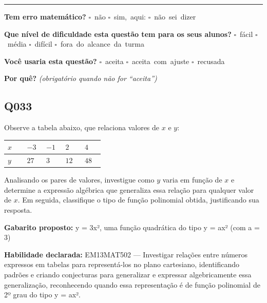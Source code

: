 \documentclass[11pt,a4paper]{article}
\begin{document}
\noindent\rule{\linewidth}{0.4pt}
\textbf{Tem erro matemático?}\quad
\mbox{$\square$~não} \quad \mbox{$\square$~sim, aqui:} \underline{\hspace{5cm}}
\quad \mbox{$\square$~não sei dizer}

\textbf{Que nível de dificuldade esta questão tem para os seus alunos?}\quad
\mbox{$\square$~fácil} \quad \mbox{$\square$~média} \quad
\mbox{$\square$~difícil} \quad \mbox{$\square$~fora do alcance da turma}

\textbf{Você usaria esta questão?}\quad
\mbox{$\square$~aceita} \quad \mbox{$\square$~aceita com ajuste} \quad
\mbox{$\square$~recusada}

\textbf{Por quê?} \emph{(obrigatório quando não for ``aceita'')}

\underline{\hspace{\linewidth}}

\underline{\hspace{\linewidth}}
\vspace{0.6em}

\begin{samepage}
\subsection*{Q033}
Observe a tabela abaixo, que relaciona valores de $x$ e $y$:

\begin{center}
\begin{tabular}{|p{0.172\linewidth}|p{0.172\linewidth}|p{0.172\linewidth}|p{0.172\linewidth}|p{0.172\linewidth}|}
\hline
\textbf{$x$} & \textbf{$-3$} & \textbf{$-1$} & \textbf{$2$} & \textbf{$4$} \\
\hline
$y$ & $27$ & $3$ & $12$ & $48$ \\
\hline
\end{tabular}
\end{center}

Analisando os pares de valores, investigue como $y$ varia em função de $x$ e determine a expressão algébrica que generaliza essa relação para qualquer valor de $x$. Em seguida, classifique o tipo de função polinomial obtida, justificando sua resposta.

\textbf{Gabarito proposto:} y = 3x², uma função quadrática do tipo y = ax² (com a = 3)

\textbf{Habilidade declarada:} EM13MAT502 --- Investigar relações entre números expressos em tabelas para representá-los no plano cartesiano, identificando padrões e criando conjecturas para generalizar e expressar algebricamente essa generalização, reconhecendo quando essa representação é de função polinomial de 2º grau do tipo y = ax².
\end{samepage}
\end{document}
